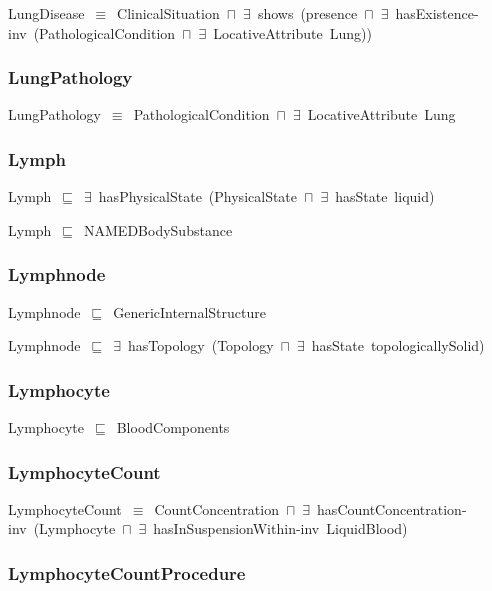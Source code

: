 \documentclass{article}
\begin{document}
LungDisease~\ensuremath{\equiv}~ClinicalSituation~\ensuremath{\sqcap}~\ensuremath{\exists}~shows~(presence~\ensuremath{\sqcap}~\ensuremath{\exists}~hasExistence-inv~(PathologicalCondition~\ensuremath{\sqcap}~\ensuremath{\exists}~LocativeAttribute~Lung))

\subsubsection*{LungPathology}

LungPathology~\ensuremath{\equiv}~PathologicalCondition~\ensuremath{\sqcap}~\ensuremath{\exists}~LocativeAttribute~Lung

\subsubsection*{Lymph}

Lymph~\ensuremath{\sqsubseteq}~\ensuremath{\exists}~hasPhysicalState~(PhysicalState~\ensuremath{\sqcap}~\ensuremath{\exists}~hasState~liquid)~

Lymph~\ensuremath{\sqsubseteq}~NAMEDBodySubstance~

\subsubsection*{Lymphnode}

Lymphnode~\ensuremath{\sqsubseteq}~GenericInternalStructure~

Lymphnode~\ensuremath{\sqsubseteq}~\ensuremath{\exists}~hasTopology~(Topology~\ensuremath{\sqcap}~\ensuremath{\exists}~hasState~topologicallySolid)~

\subsubsection*{Lymphocyte}

Lymphocyte~\ensuremath{\sqsubseteq}~BloodComponents~

\subsubsection*{LymphocyteCount}

LymphocyteCount~\ensuremath{\equiv}~CountConcentration~\ensuremath{\sqcap}~\ensuremath{\exists}~hasCountConcentration-inv~(Lymphocyte~\ensuremath{\sqcap}~\ensuremath{\exists}~hasInSuspensionWithin-inv~LiquidBlood)

\subsubsection*{LymphocyteCountProcedure}
\end{document}

